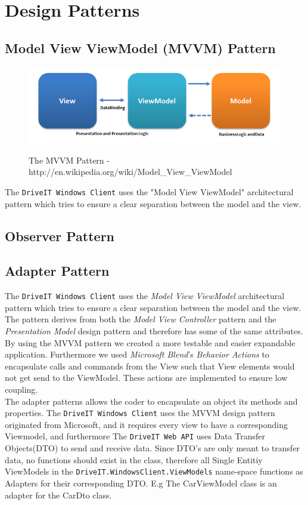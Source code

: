 \section{Design Patterns}
\subsection{Model View ViewModel (MVVM) Pattern}
\begin{figure}[H]
	\centering
	\includegraphics[scale=0.6]{Figures/WebImages/MVVMPattern}\\
	\caption{The MVVM Pattern - http://en.wikipedia.org/wiki/Model\_View\_ViewModel}
	\label{fig:MVVMPattern}
\end{figure}
The \texttt{DriveIT Windows Client} uses the "Model View ViewModel" architectural pattern which tries to ensure a clear separation between the model and the view. 
\subsection{Observer Pattern}

\subsection{Adapter Pattern}
The \texttt{DriveIT Windows Client} uses the \emph{Model View ViewModel} architectural pattern which tries to ensure a clear separation between the model and the view. The pattern derives from both the \emph{Model View Controller} pattern and the \emph{Presentation Model} design pattern and therefore has some of the same attributes. By using the MVVM pattern we created a more testable and easier expandable application. Furthermore we used \emph{Microsoft Blend}'s \emph{Behavior Actions} to encapsulate calls and commands from the View such that View elements would not get send to the ViewModel. These actions are implemented to ensure low coupling.\\

The adapter patterns allows the coder to encapsulate an object its methods and properties. The \texttt{DriveIT Windows Client} uses the MVVM design pattern originated from Microsoft, and it requires every view to have a corresponding Viewmodel, and furthermore The \texttt{DriveIT Web API} uses Data Transfer Objects(DTO) to send and receive data. Since DTO's are only meant to transfer data, no functions should exist in the class, therefore all Single Entitiy ViewModels in the \texttt{DriveIT.WindowsClient.ViewModels} name-space functions as Adapters for their corresponding DTO. E.g The CarViewModel class is an adapter for the CarDto class.\\ 

